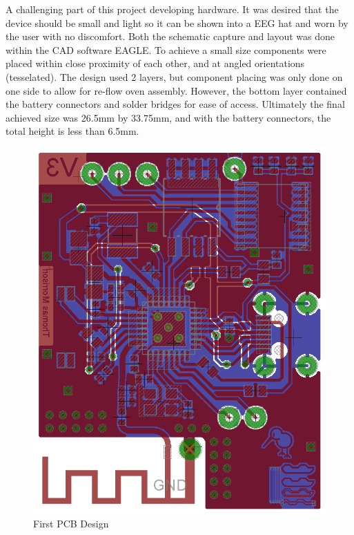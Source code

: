 \documentclass[]{article}
\begin{document}
A challenging part of this project developing hardware. It was desired that the device should be small and light so it can be shown into a \ac{EEG} hat and worn by the user with no discomfort. Both the schematic capture and layout was done within the \ac{CAD} software EAGLE. To achieve a small size components were placed within close proximity of each other, and at angled orientations (tesselated). The design used 2 layers, but component placing was only done on one side to allow for re-flow oven assembly. However, the bottom layer contained the battery connectors and solder bridges for ease of access. Ultimately the final achieved size was 26.5mm by 33.75mm, and with the battery connectors, the total height is less than 6.5mm.

\begin{figure}[H]
	\begin{center}
		\includegraphics[width = \textwidth]{boardv1}
	\end{center}
	\caption{First PCB Design}
	\label{fig:boardv1}
\end{figure}
\end{document}
